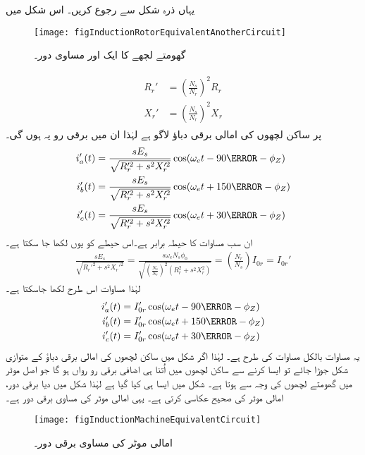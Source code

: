 یہاں ذرہ شکل   سے رجوع کریں۔ اس شکل میں
\begin{figure}
\centering
\texttt{[image: figInductionRotorEquivalentAnotherCircuit]}
\caption{گھومتے لچھے کا ایک اور مساوی دور۔}
\label{شکل_امالی_گھومتے_لچھے_کا_دوسرا_مساوی_دور}
\end{figure}
%
\begin{gather}
\begin{aligned}\label{مساوات_امالی_گھومتے_مزاحمت_امالہ_دوسری_جانب}
R_r'&=\left(\frac{N_s}{N_r} \right)^2 R_r\\
X_r'&=\left(\frac{N_s}{N_r} \right)^2 X_r
\end{aligned}
\end{gather} 
پر ساکن لچھوں کی امالی برقی دباؤ  لاگو ہے لہٰذا ان میں برقی رو یہ ہوں گی۔
\begin{gather}
\begin{aligned}\label{مساوات_امالی_تین_رو}
i_a'(t)&=\frac{s E_s}{\sqrt{R_r'^2+s^2 X_r'^2}} \cos (\omega_e t -90\degree -\phi_Z)\\
i_b'(t)&=\frac{s E_s}{\sqrt{R_r'^2+s^2 X_r'^2}} \cos (\omega_e t +150\degree -\phi_Z)\\
i_c'(t)&=\frac{s E_s}{\sqrt{R_r'^2+s^2 X_r'^2}} \cos (\omega_e t +30\degree -\phi_Z)
\end{aligned}
\end{gather}
ان سب مساوات کا حیطہ برابر ہے۔اس حیطے کو یوں لکھا جا سکتا ہے۔
\begin{align}\label{مساوات_امالی_رو_دباؤ_تعلق_الف}
\frac{s E_s}{\sqrt{R_r'^2+s^2 X_r'^2}}=\frac{s \omega_e N_s \phi_0}{\sqrt{\left( \frac{N_s}{N_r}\right)^2 \left(R_r^2+s^2X_r^2 \right)}}=\left(\frac{N_r}{N_s}\right) I_{0r}=I_{0r}'
\end{align}
لہٰذا مساوات   اس طرح لکھا جاسکتا ہے۔
\begin{gather}
\begin{aligned}
i_a'(t)&=I_{0r}' \cos (\omega_e t -90\degree -\phi_Z)\\
i_b'(t)&=I_{0r}' \cos (\omega_e t +150\degree -\phi_Z)\\
i_c'(t)&=I_{0r}' \cos (\omega_e t +30\degree -\phi_Z)
\end{aligned}
\end{gather}
یہ مساوات بالکل مساوات   کی طرح ہے۔ لہٰذا اگر شکل   میں ساکن لچھوں کی امالی برقی دباؤ  کے متوازی شکل   جوڑا جائے تو ایسا کرنے سے ساکن لچھوں میں اُتنا ہی اضافی برقی رو رواں ہو گا جو اصل موٹر میں گھومتے لچھوں کی وجہ سے ہوتا ہے۔ شکل   میں ایسا ہی کیا گیا ہے لہٰذا شکل میں دیا برقی دور، امالی موٹر کی صحیح عکاسی کرتی ہے۔ یہی امالی موٹر کی مساوی برقی دور ہے۔
\begin{figure}
\centering
\texttt{[image: figInductionMachineEquivalentCircuit]}
\caption{امالی موٹر کی مساوی برقی دور۔}
\label{شکل_امالی_مشین_کا_مکمل_مساوی_دور}
\end{figure}


